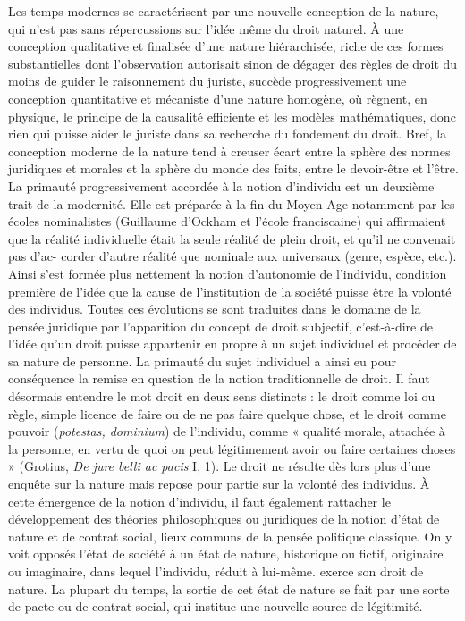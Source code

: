 Les temps modernes se caractérisent
par une nouvelle conception de la nature,
qui n’est pas sans répercussions sur l’idée
même du droit naturel. À une conception
qualitative et finalisée d’une nature hiérarchisée, riche de ces formes substantielles dont l’observation autorisait sinon
de dégager des règles de droit du moins
de guider le raisonnement du juriste, succède progressivement une conception
%
quantitative et mécaniste d’une nature
homogène, où règnent, en physique, le
principe de la causalité efficiente et les
modèles mathématiques, donc rien qui
puisse aider le juriste dans sa recherche
du fondement du droit. Bref, la conception moderne de la nature tend à creuser
écart entre la sphère des normes juridiques et morales et la sphère du monde
des faits, entre le devoir-être et l’être. La
primauté progressivement accordée à la
notion d’individu est un deuxième trait de
la modernité. Elle est préparée à la fin du
Moyen Age notamment par les écoles
nominalistes (Guillaume d’Ockham et
l’école franciscaine) qui affirmaient que la
réalité individuelle était la seule réalité de
plein droit, et qu’il ne convenait pas d’ac-
corder d’autre réalité que nominale aux
universaux (genre, espèce, etc.). Ainsi
s’est formée plus nettement la notion
d’autonomie de l'individu, condition première de l’idée que la cause de l’institution de la société puisse être la volonté
des individus. Toutes ces évolutions se
sont traduites dans le domaine de la pensée juridique par l'apparition du concept
de droit subjectif, c’est-à-dire de l’idée
qu’un droit puisse appartenir en propre à
un sujet individuel et procéder de sa
nature de personne. La primauté du sujet
individuel a ainsi eu pour conséquence la
remise en question de la notion traditionnelle de droit. Il faut désormais entendre
le mot droit en deux sens distincts : le
droit comme loi ou règle, simple licence
de faire ou de ne pas faire quelque chose,
et le droit comme pouvoir ({\it potestas,
dominium}) de l'individu, comme « qualité
morale, attachée à la personne, en vertu
de quoi on peut légitimement avoir ou
faire certaines choses » (Grotius, {\it De jure
belli ac pacis} I, 1). Le droit ne résulte dès
lors plus d’une enquête sur la nature mais
repose pour partie sur la volonté des individus. À cette émergence de la notion
d’individu, il faut également rattacher le
développement des théories philosophiques ou juridiques de la notion d’état
de nature et de contrat social, lieux
communs de la pensée politique classique.
On y voit opposés l’état de société à un
état de nature, historique ou fictif, originaire ou imaginaire, dans lequel l’individu, réduit à lui-même. exerce son droit
de nature. La plupart du temps, la sortie
de cet état de nature se fait par une sorte
%
de pacte ou de contrat social, qui institue
une nouvelle source de légitimité.

